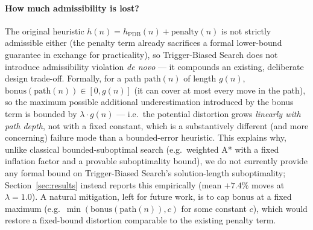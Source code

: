 \documentclass[10pt,conference]{article}
\begin{document}
\paragraph{How much admissibility is lost?} The original heuristic
$h(n) = h_{\mathrm{PDB}}(n) + \mathrm{penalty}(n)$ is not strictly
admissible either (the penalty term already sacrifices a formal
lower-bound guarantee in exchange for practicality), so
Trigger-Biased Search does not introduce admissibility violation
\emph{de novo} --- it compounds an existing, deliberate design
trade-off. Formally, for a path $\mathrm{path}(n)$ of length $g(n)$,
$\mathrm{bonus}(\mathrm{path}(n)) \in [0, g(n)]$ (it can cover at
most every move in the path), so the maximum possible additional
underestimation introduced by the bonus term is bounded by
$\lambda \cdot g(n)$ --- i.e.\ the potential distortion grows
\emph{linearly with path depth}, not with a fixed constant, which is
a substantively different (and more concerning) failure mode than a
bounded-error heuristic. This explains why, unlike classical
bounded-suboptimal search (e.g.\ weighted A* with a fixed inflation
factor and a provable suboptimality bound), we do not currently
provide any formal bound on Trigger-Biased Search's solution-length
suboptimality; Section~\ref{sec:results} instead reports this
empirically (mean $+7.4\%$ moves at $\lambda=1.0$). A natural
mitigation, left for future work, is to cap $\mathrm{bonus}$ at a
fixed maximum (e.g.\ $\min(\mathrm{bonus}(\mathrm{path}(n)), c)$ for
some constant $c$), which would restore a fixed-bound distortion
comparable to the existing penalty term.
\end{document}
